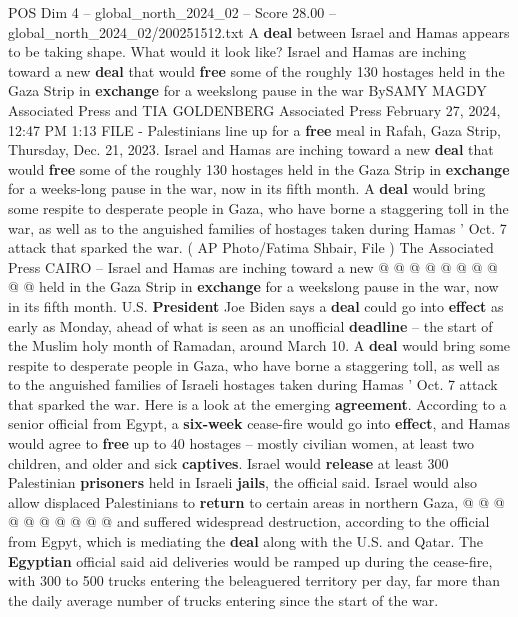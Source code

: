 \begin{textsample}{POS Dim 4 – global\_north\_2024\_02 – Score 28.00 – global\_north\_2024\_02/200251512.txt}  \label{ex:f4_pos_183}
A \textbf{deal} between Israel and Hamas appears to be taking shape.
What would it look like?
Israel and Hamas are inching toward a new \textbf{deal} that would \textbf{free} some of the roughly 130 hostages held in the Gaza Strip in \textbf{exchange} for a weekslong pause in the war BySAMY MAGDY Associated Press and TIA GOLDENBERG Associated Press February 27, 2024, 12:47 PM 1:13 FILE - Palestinians line up for a \textbf{free} meal in Rafah, Gaza Strip, Thursday, Dec. 21, 2023.
Israel and Hamas are inching toward a new \textbf{deal} that would \textbf{free} some of the roughly 130 hostages held in the Gaza Strip in \textbf{exchange} for a weeks-long pause in the war, now in its fifth month.
A \textbf{deal} would bring some respite to desperate people in Gaza, who have borne a staggering toll in the war, as well as to the anguished families of hostages taken during Hamas ' Oct. 7 attack that sparked the war. ( AP Photo/Fatima Shbair, File ) The Associated Press CAIRO -- Israel and Hamas are inching toward a new @ @ @ @ @ @ @ @ @ @ held in the Gaza Strip in \textbf{exchange} for a weekslong pause in the war, now in its fifth month.
U.S. \textbf{President} Joe Biden says a \textbf{deal} could go into \textbf{effect} as early as Monday, ahead of what is seen as an unofficial \textbf{deadline} -- the start of the Muslim holy month of Ramadan, around March 10.
A \textbf{deal} would bring some respite to desperate people in Gaza, who have borne a staggering toll, as well as to the anguished families of Israeli hostages taken during Hamas ' Oct. 7 attack that sparked the war.
Here is a look at the emerging \textbf{agreement}.
According to a senior official from Egypt, a \textbf{six-week} cease-fire would go into \textbf{effect}, and Hamas would agree to \textbf{free} up to 40 hostages -- mostly civilian women, at least two children, and older and sick \textbf{captives}.
Israel would \textbf{release} at least 300 Palestinian \textbf{prisoners} held in Israeli \textbf{jails}, the official said.
Israel would also allow displaced Palestinians to \textbf{return} to certain areas in northern Gaza, @ @ @ @ @ @ @ @ @ @ and suffered widespread destruction, according to the official from Egpyt, which is mediating the \textbf{deal} along with the U.S. and Qatar.
The \textbf{Egyptian} official said aid deliveries would be ramped up during the cease-fire, with 300 to 500 trucks entering the beleaguered territory per day, far more than the daily average number of trucks entering since the start of the war.

\end{textsample}
